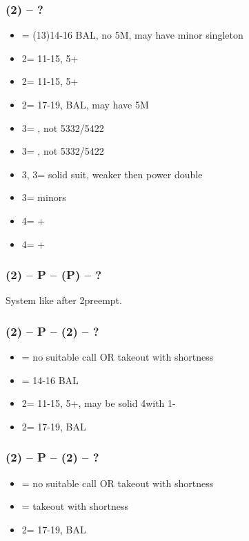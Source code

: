 \subsubsection*{(2\diams) -- ?}
\begin{itemize}
    \item \dbl = (13)14-16 BAL, no 5M, may have minor singleton
    \item 2\hearts = 11-15, 5+\hearts
    \item 2\spades = 11-15, 5+\spades
    \item 2\nt = 17-19, BAL, may have 5M
    \item 3\clubs = \clubs, not 5332/5422
    \item 3\diams = \diams, not 5332/5422
    \item 3\hearts, 3\spades = solid suit, weaker then power double
    \item 3\nt = minors
    \item 4\clubs = \clubs + \major
    \item 4\diams = \diams + \major
\end{itemize}

\subsubsection*{(2\diams) -- P -- (P\alrts) -- ?}
System like after 2\diams preempt.

\subsubsection*{(2\diams) -- P -- (2\hearts) -- ?}
\begin{itemize}
    \item \pass = no suitable call OR takeout with \spades shortness
    \item \dbl = 14-16 BAL \vimp
    \item 2\spades = 11-15, 5+\spades, may be solid 4\spades with 1-\hearts
    \item 2\nt = 17-19, BAL
\end{itemize}

\subsubsection*{(2\diams) -- P -- (2\spades) -- ?}
\begin{itemize}
    \item \pass = no suitable call OR takeout with \hearts shortness
    \item \dbl = takeout with \spades shortness \imp
    \item 2\nt = 17-19, BAL
\end{itemize}

